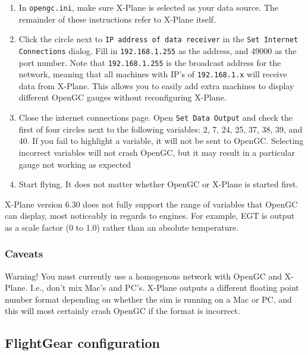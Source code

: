 \documentclass[11pt]{article}
\begin{document}
\begin{enumerate}

\item In \texttt{opengc.ini}, make sure X-Plane is selected as your data source. The remainder of these instructions refer to X-Plane itself.

\item Click the circle next to \texttt{IP address of data receiver} in the \texttt{Set Internet Connections} dialog. Fill in \texttt{192.168.1.255} as the address, and 49000 as the port number. Note that \texttt{192.168.1.255} is the broadcast address for the network, meaning that all machines with IP's of \texttt{192.168.1.x} will receive data from X-Plane. This allows you to easily add extra machines to display different OpenGC gauges without reconfiguring X-Plane.

\item Close the internet connections page. Open \texttt{Set Data Output} and check the first of four circles next to the following variables: 2, 7, 24, 25, 37, 38, 39, and 40. If you fail to highlight a variable, it will not be sent to OpenGC. Selecting incorrect variables will not crash OpenGC, but it may result in a particular gauge not working as expected

\item Start flying. It does not matter whether OpenGC or X-Plane is started first.

\end{enumerate}

X-Plane version 6.30 does not fully support the range of variables that OpenGC can display, most noticeably in regards to engines. For example, EGT is output as a scale factor (0 to 1.0) rather than an absolute temperature.

\subsubsection{Caveats}

Warning! You must currently use a homogenous network with OpenGC and X-Plane. I.e., don't mix Mac's and PC's. X-Plane outputs a different floating point number format depending on whether the sim is running on a Mac or PC, and this will most certainly crash OpenGC if the format is incorrect.

\subsection{FlightGear configuration}
\end{document}
